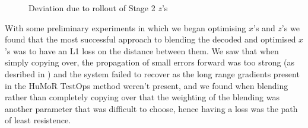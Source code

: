 \begin{figure}[h!]
    \centering
    \hfil
    \hfil
    \hfil
    \caption{Deviation due to rollout of Stage 2 $z$'s}
    \label{fig:humor_stage_2_rollout_deviation}
\end{figure}


With some preliminary experiments in which we began optimising $x$'s and $z$'s we found that the most successful approach to blending the decoded and optimised $x$'s was to have an L1 loss on the distance between them. We saw that when simply copying over, the propagation of small errors forward was too strong (as desribed in ) and the system failed to recover as the long range gradients present in the HuMoR TestOps method weren't present, and we found when blending rather than completely copying over that the weighting of the blending was another parameter that was difficult to choose, hence having a loss was the path of least resistence.

